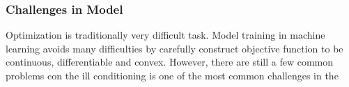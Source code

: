 \subsubsection{Challenges in Model }

Optimization is traditionally very difficult task. Model training in machine learning avoids many difficulties by carefully construct objective function to be continuous, differentiable and convex. However, there are still a few common problems con
the ill conditioning is one of the most common challenges in the 